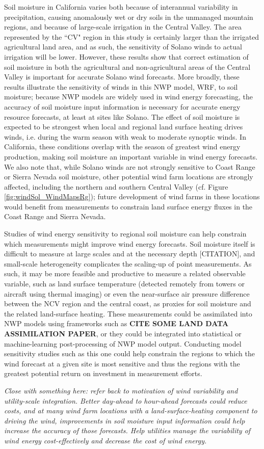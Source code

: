 Soil moisture in California varies both because of interannual variability in precipitation, causing anomalously wet or dry soils in the unmanaged mountain regions, and because of large-scale irrigation in the Central Valley.  The area represented by the ``CV" region in this study is certainly larger than the irrigated agricultural land area, and as such, the sensitivity of Solano winds to actual irrigation will be lower.  However, these results show that correct estimation of soil moisture in both the agricultural and non-agricultural areas of the Central Valley is important for accurate Solano wind forecasts.  More broadly, these results illustrate the sensitivity of winds in this NWP model, WRF, to soil moisture; because NWP models are widely used in wind energy forecasting, the accuracy of soil moisture input information is necessary for accurate energy resource forecasts, at least at sites like Solano.  The effect of soil moisture is expected to be strongest when local and regional land surface heating drives winds, i.e. during the warm season with weak to moderate synoptic winds.  In California, these conditions overlap with the season of greatest wind energy production, making soil moisture an important variable in wind energy forecasts.  We also note that, while Solano winds are not strongly sensitive to Coast Range or Sierra Nevada soil moisture, other potential wind farm locations are strongly affected, including the northern and southern Central Valley (cf. Figure \ref{fig:windSol_WindMapsRg}); future development of wind farms in these locations would benefit from measurements to constrain land surface energy fluxes in the Coast Range and Sierra Nevada.

Studies of wind energy sensitivity to regional soil moisture can help constrain which measurements might improve wind energy forecasts.  Soil moisture itself is difficult to measure at large scales and at the necessary depth [CITATION], and small-scale heterogeneity complicates the scaling-up of point measurements.  As such, it may be more feasible and productive to measure a related observable variable, such as land surface temperature (detected remotely from towers or aircraft using thermal imaging) or even the near-surface air pressure difference between the NCV region and the central coast, as proxies for soil moisture and the related land-surface heating.  These measurements could be assimilated into NWP models using frameworks such as \textbf{CITE SOME LAND DATA ASSIMILATION PAPER}, or they could be integrated into statistical or machine-learning post-processing of NWP model output.  Conducting model sensitivity studies such as this one could help constrain the regions to which the wind forecast at a given site is most sensitive and thus the regions with the greatest potential return on investment in measurement efforts.

\textit{Close with something here: refer back to motivation of wind variability and utility-scale integration.  Better day-ahead to hour-ahead forecasts could reduce costs, and at many wind farm locations with a land-surface-heating component to driving the wind, improvements in soil moisture input information could help increase the accuracy of those forecasts.  Help utilities manage the variability of wind energy cost-effectively and decrease the cost of wind energy.}
